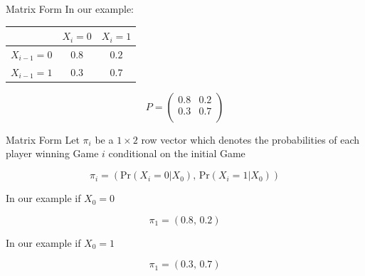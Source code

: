 \documentclass[10pt]{beamer}
\begin{document}
\begin{frame}{Matrix Form}
In our example:

\begin{table}
\begin{center}
\begin{tabular}{c|cc}
& $X_{i}=0$ & $X_{i}=1$\\
\hline
$X_{i-1}=0$ & $0.8$ & $0.2$\\
$X_{i-1}=1$ & $0.3$ & $0.7$\\
\end{tabular}
\end{center}
\end{table}

\begin{equation}
P=\left(
\begin{array}{cc}
0.8 & 0.2\\0.3 & 0.7\\
\end{array}
\right)
\end{equation}
\end{frame}
\begin{frame}{Matrix Form}
Let $\pi_i$ be a $1\times 2$ row vector which denotes the probabilities of each player winning Game $i$ conditional on the initial Game

\begin{equation}
\pi_i=\left(\mbox{Pr}(X_i=0|X_0),
\,\mbox{Pr}(X_i=1|X_0)\right)
\end{equation}

In our example if $X_0=0$

\begin{equation}
\pi_1=\left(0.8,
\, 0.2\right)
\end{equation}

In our example if $X_0=1$

\begin{equation}
\pi_1=\left(0.3,\, 0.7\right)
\end{equation}
\end{frame}
\end{document}
